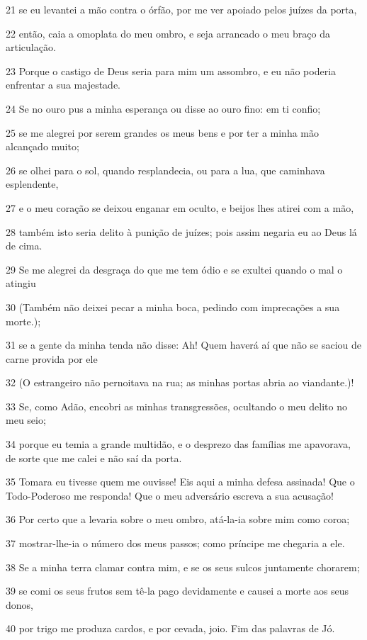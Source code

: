 \par 21 se eu levantei a mão contra o órfão, por me ver apoiado pelos juízes da porta,
\par 22 então, caia a omoplata do meu ombro, e seja arrancado o meu braço da articulação.
\par 23 Porque o castigo de Deus seria para mim um assombro, e eu não poderia enfrentar a sua majestade.
\par 24 Se no ouro pus a minha esperança ou disse ao ouro fino: em ti confio;
\par 25 se me alegrei por serem grandes os meus bens e por ter a minha mão alcançado muito;
\par 26 se olhei para o sol, quando resplandecia, ou para a lua, que caminhava esplendente,
\par 27 e o meu coração se deixou enganar em oculto, e beijos lhes atirei com a mão,
\par 28 também isto seria delito à punição de juízes; pois assim negaria eu ao Deus lá de cima.
\par 29 Se me alegrei da desgraça do que me tem ódio e se exultei quando o mal o atingiu
\par 30 (Também não deixei pecar a minha boca, pedindo com imprecações a sua morte.);
\par 31 se a gente da minha tenda não disse: Ah! Quem haverá aí que não se saciou de carne provida por ele
\par 32 (O estrangeiro não pernoitava na rua; as minhas portas abria ao viandante.)!
\par 33 Se, como Adão, encobri as minhas transgressões, ocultando o meu delito no meu seio;
\par 34 porque eu temia a grande multidão, e o desprezo das famílias me apavorava, de sorte que me calei e não saí da porta.
\par 35 Tomara eu tivesse quem me ouvisse! Eis aqui a minha defesa assinada! Que o Todo-Poderoso me responda! Que o meu adversário escreva a sua acusação!
\par 36 Por certo que a levaria sobre o meu ombro, atá-la-ia sobre mim como coroa;
\par 37 mostrar-lhe-ia o número dos meus passos; como príncipe me chegaria a ele.
\par 38 Se a minha terra clamar contra mim, e se os seus sulcos juntamente chorarem;
\par 39 se comi os seus frutos sem tê-la pago devidamente e causei a morte aos seus donos,
\par 40 por trigo me produza cardos, e por cevada, joio. Fim das palavras de Jó.

